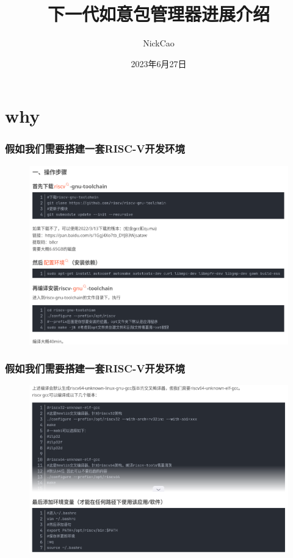 \documentclass{ctexbeamer}
\title{下一代如意包管理器进展介绍}
\author{NickCao}
\date{2023年6月27日}
\begin{document}
\frame{\titlepage}

\section{why}

\begin{frame}
  \frametitle{假如我们需要搭建一套RISC-V开发环境}
  \begin{figure}
    \includegraphics[width=\linewidth]{./csdn-1.png}
  \end{figure}
\end{frame}

\begin{frame}
  \frametitle{假如我们需要搭建一套RISC-V开发环境}
  \begin{figure}
    \includegraphics[width=\linewidth]{./csdn-2.png}
  \end{figure}
\end{frame}
\end{document}
